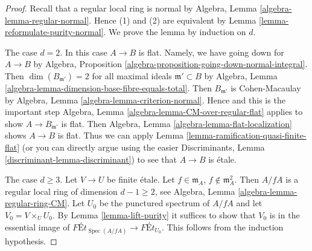 \documentclass{stacks-project}
\theoremstyle{plain}
\theoremstyle{definition}
\theoremstyle{remark}
\numberwithin{equation}{subsection}
\def\Spec{\mathop{\mathrm{Spec}}}
\begin{document}
\begin{proof}
Recall that a regular local ring is normal by
Algebra, Lemma \ref{algebra-lemma-regular-normal}.
Hence (1) and (2) are equivalent by
Lemma \ref{lemma-reformulate-purity-normal}.
We prove the lemma by induction on $d$.

\medskip\noindent
The case $d = 2$. In this case $A \to B$ is flat.
Namely, we have going down for $A \to B$ by
Algebra, Proposition \ref{algebra-proposition-going-down-normal-integral}.
Then $\dim(B_{\mathfrak m'}) = 2$ for all maximal ideals
$\mathfrak m' \subset B$ by
Algebra, Lemma \ref{algebra-lemma-dimension-base-fibre-equals-total}.
Then $B_{\mathfrak m'}$ is Cohen-Macaulay by
Algebra, Lemma \ref{algebra-lemma-criterion-normal}.
Hence and this is the important step
Algebra, Lemma \ref{algebra-lemma-CM-over-regular-flat}
applies to show $A \to B_{\mathfrak m'}$ is flat.
Then Algebra, Lemma \ref{algebra-lemma-flat-localization}
shows $A \to B$ is flat. Thus we can apply
Lemma \ref{lemma-ramification-quasi-finite-flat}
(or you can directly argue using the easier
Discriminants, Lemma \ref{discriminant-lemma-discriminant})
to see that $A \to B$ is \'etale.

\medskip\noindent
The case $d \geq 3$. Let $V \to U$ be finite \'etale.
Let $f \in \mathfrak m_A$, $f \not \in \mathfrak m_A^2$.
Then $A/fA$ is a regular local ring of dimension $d - 1 \geq 2$, see
Algebra, Lemma \ref{algebra-lemma-regular-ring-CM}.
Let $U_0$ be the punctured spectrum of $A/fA$ and let
$V_0 = V \times_U U_0$.
By Lemma \ref{lemma-lift-purity}
it suffices to show that $V_0$ is in the essential
image of $\textit{F\'Et}_{\Spec(A/fA)} \to \textit{F\'Et}_{U_0}$.
This follows from the induction hypothesis.
\end{proof}
\end{document}
